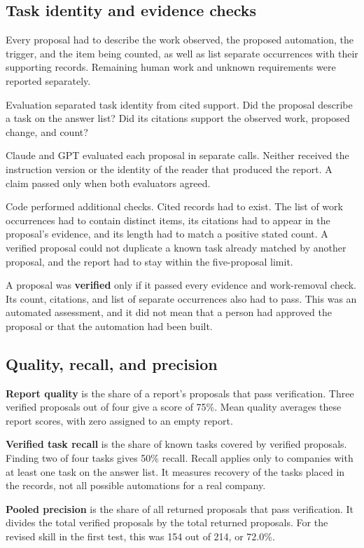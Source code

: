 \documentclass[11pt]{article}
\begin{document}
\subsection{Task identity and evidence checks}
Every proposal had to describe the work observed, the proposed automation, the trigger, and the item being counted, as well as list separate occurrences with their supporting records. Remaining human work and unknown requirements were reported separately.

Evaluation separated task identity from cited support. Did the proposal describe a task on the answer list? Did its citations support the observed work, proposed change, and count?

Claude and GPT evaluated each proposal in separate calls. Neither received the instruction version or the identity of the reader that produced the report. A claim passed only when both evaluators agreed.

Code performed additional checks. Cited records had to exist. The list of work occurrences had to contain distinct items, its citations had to appear in the proposal's evidence, and its length had to match a positive stated count. A verified proposal could not duplicate a known task already matched by another proposal, and the report had to stay within the five-proposal limit.

A proposal was \textbf{verified} only if it passed every evidence and work-removal check. Its count, citations, and list of separate occurrences also had to pass. This was an automated assessment, and it did not mean that a person had approved the proposal or that the automation had been built.

\subsection{Quality, recall, and precision}
\textbf{Report quality} is the share of a report's proposals that pass verification. Three verified proposals out of four give a score of 75\%. Mean quality averages these report scores, with zero assigned to an empty report.

\textbf{Verified task recall} is the share of known tasks covered by verified proposals. Finding two of four tasks gives 50\% recall. Recall applies only to companies with at least one task on the answer list. It measures recovery of the tasks placed in the records, not all possible automations for a real company.

\textbf{Pooled precision} is the share of all returned proposals that pass verification. It divides the total verified proposals by the total returned proposals. For the revised skill in the first test, this was 154 out of 214, or 72.0\%.
\end{document}
